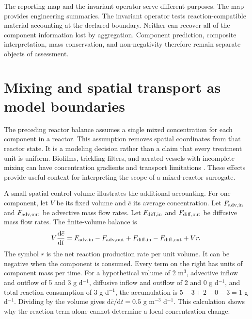 The reporting map and the invariant operator serve different purposes. The map provides engineering summaries. The invariant operator tests reaction-compatible material accounting at the declared boundary. Neither can recover all of the component information lost by aggregation. Component prediction, composite interpretation, mass conservation, and non-negativity therefore remain separate objects of assessment.


\section{Mixing and spatial transport as model boundaries}

The preceding reactor balance assumes a single mixed concentration for each component in a reactor. This assumption removes spatial coordinates from that reactor state. It is a modeling decision rather than a claim that every treatment unit is uniform. Biofilms, trickling filters, and aerated vessels with incomplete mixing can have concentration gradients and transport limitations \citep{Wik2003,Zhang1994,SadinoRiquelme2023}. These effects provide useful context for interpreting the scope of a mixed-reactor surrogate.

A small spatial control volume illustrates the additional accounting. For one component, let $V$ be its fixed volume and $\bar c$ its average concentration. Let $F_{\rm adv,in}$ and $F_{\rm adv,out}$ be advective mass flow rates. Let $F_{\rm diff,in}$ and $F_{\rm diff,out}$ be diffusive mass flow rates. The finite-volume balance is
\begin{equation}
\equationname{Control-volume component equation with transport and reaction}
V\frac{\mathrm d\bar c}{\mathrm dt}
=F_{\rm adv,in}-F_{\rm adv,out}
+F_{\rm diff,in}-F_{\rm diff,out}+Vr.
\label{eq:teaching_spatial_control_volume}
\end{equation}
The symbol $r$ is the net reaction production rate per unit volume. It can be negative when the component is consumed. Every term on the right has units of component mass per time. For a hypothetical volume of 2 m$^3$, advective inflow and outflow of 5 and 3 g d$^{-1}$, diffusive inflow and outflow of 2 and 0 g d$^{-1}$, and total reaction consumption of 3 g d$^{-1}$, the accumulation is $5-3+2-0-3=1$ g d$^{-1}$. Dividing by the volume gives $\mathrm d\bar c/\mathrm dt=0.5$ g m$^{-3}$ d$^{-1}$. This calculation shows why the reaction term alone cannot determine a local concentration change.

